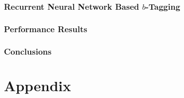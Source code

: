 \documentclass[USenglish,texlive=2013]{\ATLASLATEXPATH atlasdoc}
\begin{document}
\section{Recurrent Neural Network Based $b$-Tagging}
\label{sec:rnn}




\section{Performance Results}
\label{sec:results}



\section{Conclusions}
\label{sec:conclusion}



\printbibliography


\pagebreak

\appendix
\part*{Appendix}


%

\clearpage
\end{document}

